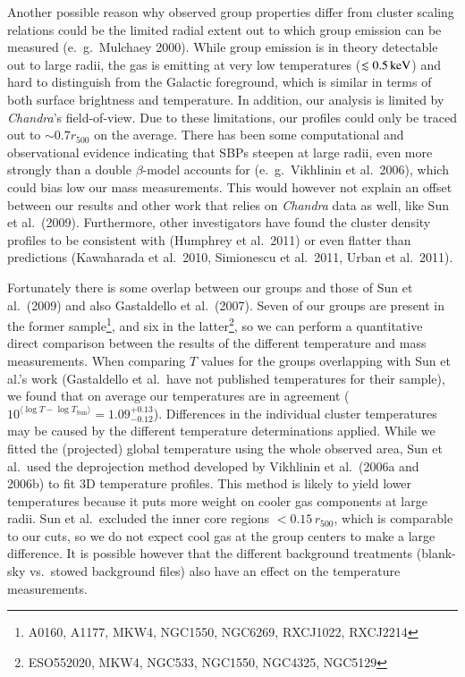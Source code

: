 \documentclass[structabstract]{aa}
\begin{document}
Another possible reason why observed group properties differ from
cluster scaling relations could be the limited radial extent out to
which group emission can be measured (e.\ g.\ Mulchaey 2000). While
group emission is in theory detectable out to large radii, the gas is
emitting at very low temperatures ($\lesssim \unit[0.5]{keV}$) and
hard to distinguish from the Galactic foreground, which is similar in
terms of both surface brightness and temperature. In addition, our
analysis is limited by \emph{Chandra}'s field-of-view. Due to
  these limitations, our profiles could only be traced out to
  $\sim 0.7 r_{500}$ on the average. There has been some
computational and observational evidence indicating that SBPs steepen
at large radii, even more strongly than a double $\beta$-model
accounts for (e.\ g.\ Vikhlinin et al.\ 2006), which could bias
low our mass measurements. This would however not explain an
  offset between our results and other work that relies on
  \emph{Chandra} data as well, like Sun et al.\ (2009). Furthermore,
  other investigators have found the cluster density profiles to be
  consistent with (Humphrey et al.\ 2011) or even flatter than
  predictions (Kawaharada et al.\ 2010, Simionescu et al.\ 2011, Urban
  et al.\ 2011).

Fortunately there is some overlap between our groups and those of Sun
et al.\ (2009) and also Gastaldello et al.\ (2007). Seven of our
groups are present in the former sample\footnote{A0160, A1177, MKW4,
  NGC1550, NGC6269, RXCJ1022, RXCJ2214}, and six in the
latter\footnote{ESO552020, MKW4, NGC533, NGC1550, NGC4325, NGC5129},
so we can perform a quantitative direct comparison between the
results of the different temperature and mass measurements. When
comparing $T$ values for the groups overlapping with Sun et al.'s work
(Gastaldello et al.\ have not published temperatures for their
sample), we found that on average our temperatures are in agreement
($10^{\langle\log T-\log
T_{\text{Sun}}\rangle}=1.09^{+0.13}_{-0.12}$). Differences in the
individual cluster temperatures may be caused by the different
temperature determinations applied. While we fitted the (projected)
global temperature using the whole observed area, Sun et al.\ used the
deprojection method developed by Vikhlinin et al.\ (2006a and 2006b)
to fit 3D temperature profiles. This method is likely to yield lower
temperatures because it puts more weight on cooler gas components at
large radii. Sun et al.\ excluded the inner core regions
$<0.15\,r_{500}$, which is comparable to our cuts, so we do not expect
cool gas at the group centers to make a large difference. It is
possible however that the different background treatments (blank-sky
vs.\ stowed background files) also have an effect on the temperature
measurements.
\end{document}
